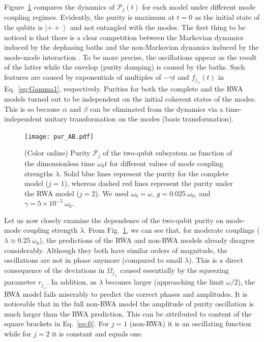 \documentclass[%
reprint,
amsmath,amssymb,
aps,
pra,
]{revtex4-1}
\newcommand{\ket}[1]{\left| #1 \right>} %
\begin{document}
Figure~\ref{fg:purAB} compares the dynamics of $\mathcal{P}_j(t)$ for each model under different mode coupling regimes. Evidently, the purity is maximum at $t=0$ as the initial state of the qubits is $\ket{++}$  and not entangled with the modes. The first thing to be noticed is that there is a clear competition between the Markovian dynamics induced by the dephasing baths and the non-Markovian dynamics induced by the mode-mode interaction \cite{car15}. To be more precise, the oscillations appear as the result of the latter while the envelop (purity damping) is caused by the baths. Such features are caused by exponentials of multiples of $-\gamma t$ and $f_{j_\pm}(t)$ in Eq.~\eqref{eq:Gamma1}, respectively. Purities for both the complete and the RWA models turned out to be independent on the initial coherent states of the modes. This is so because $\alpha$ and $\beta$ can be eliminated from the dynamics via a time-independent unitary transformation on the modes (basis transformation).
\begin{figure}[h!]
\centering
\texttt{[image: pur\_AB.pdf]}
\caption{\label{fg:purAB} (Color online) Purity $\mathcal{P}_{j}$ of the two-qubit subsystem as function of the dimensionless time $\omega_0 t$ for different values of mode coupling strengths $\lambda$. Solid blue lines represent the purity for the complete model ($j=1$), whereas dashed red lines represent the purity under the RWA model ($j=2$). %
We used $\omega_0=\omega$, $g=0.025\ \omega_0$, and $\gamma=5\times10^{-5}\ \omega_0$.}
\end{figure}

Let us now closely examine the dependence of the two-qubit purity on mode-mode coupling strength $\lambda$. From Fig.~\ref{fg:purAB}, we can  see that, for moderate couplings ($\lambda\approx 0.25\ \omega_0$), the predictions of the RWA and non-RWA models already disagree considerably. Although they both have similar orders of magnitude, the oscillations are not in phase anymore (compared to small $\lambda$). This is a direct consequence of the deviations in $\Omega_{j_\pm}$ caused essentially by the squeezing parameter $r_{j_\pm}$. In addition, as $\lambda$ becomes larger (approaching the limit $\omega/2$), the RWA model fails miserably to predict the correct phases and amplitudes. It is noticeable that in the full non-RWA model the amplitude of purity oscillation is much larger than the RWA prediction. This can be attributed to content of the square brackets in Eq.~\eqref{eq:fj}. For $j=1$ (non-RWA) it is an oscillating function while for  $j=2$ it is constant and equals one. 
\end{document}
